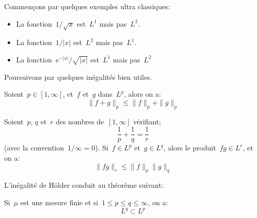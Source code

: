 Commençons par quelques exemples ultra classiques:
\begin{itemize}
  \item La fonction~$1/\sqrt{x}$ est~$L^1$ mais pas~$L^2$.
  \item La fonction~$1/|x|$ est~$L^2$ mais pas~$L^1$.
  \item La fonction~$\mathrm{e}^{-|x|}/\sqrt{|x|}$ est~$L^1$ mais pas~$L^2$
\end{itemize}

\medskip
Poursuivons par quelques inégalités bien utiles.

\begin{theoreme}
Soient~$p\in[1,\infty]$, et~$f$ et~$g$ dans~$L^p$, alors on a:
\begin{equation}\|f+g\|_p\le\|f\|_p+\|g\|_p\end{equation}
\end{theoreme}

\begin{theoreme}
Soient~$p$, $q$ et~$r$ des nombres de~$[1,\infty]$ vérifiant;
\begin{equation}\dfrac1p+\dfrac1q=\dfrac1r\end{equation} (avec la convention~$1/\infty=0$).
Si~$f\in L^p$ et~$g\in L^q$, alors le produit~$fg\in L^r$, et on a:
\begin{equation}\|fg\|_r\le\|f\|_p\|g\|_q\end{equation}
\end{theoreme}

L'inégalité de Hölder conduit au théorème suivant:
\begin{theoreme}
Si~$\mu$ est une mesure finie et si~$1\le p\le q\le \infty$, on a:
\begin{equation}L^q\subset L^p\end{equation}
\end{theoreme}

